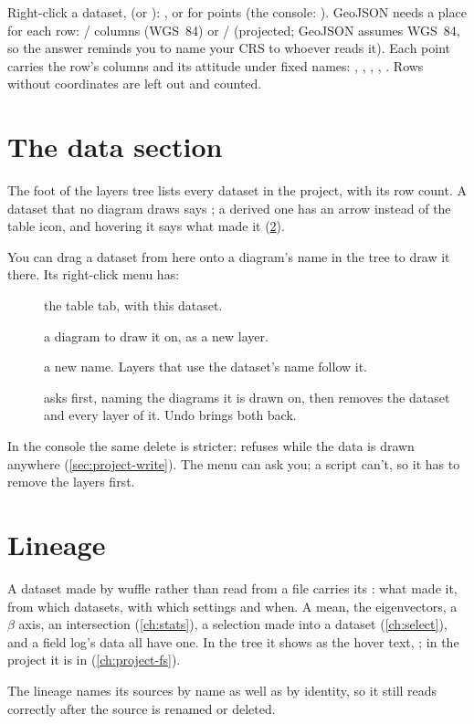 Right-click a dataset,  (or ): , or  for points (the console: ). GeoJSON needs a place for each row:  /  columns (WGS~84) or  / 
(projected; GeoJSON assumes WGS~84, so the answer reminds you to name your CRS to whoever reads it). Each
point carries the row's columns and its attitude under fixed names: , ,
, , . Rows without coordinates are left out and counted.

\section{The data section}\label{sec:data-section}

The foot of the layers tree lists every dataset in the project, with its row count. A dataset that no
diagram draws says ; a derived one has an arrow instead of the table icon, and hovering
it says what made it (\cref{sec:lineage}).

You can drag a dataset from here onto a diagram's name in the tree to draw it there. Its right-click menu
has:

\begin{description}
\item[] the table tab, with this dataset.
\item[] a diagram to draw it on, as a new layer.
\item[] a new name. Layers that use the dataset's name follow it.
\item[] asks first, naming the diagrams it is drawn on, then removes the dataset
and every layer of it. Undo brings both back.
\end{description}

\begin{note}
In the console the same delete is stricter:  refuses while the data is drawn
anywhere (\cref{sec:project-write}). The menu can ask you; a script can't, so it has to remove the layers
first.
\end{note}

\section{Lineage}\label{sec:lineage}

A dataset made by wuffle rather than read from a file carries its : what made it, from
which datasets, with which settings and when. A mean, the eigenvectors, a $\beta$ axis, an intersection
(\cref{ch:stats}), a selection made into a dataset (\cref{ch:select}), and a field log's data all have
one. In the tree it shows as the hover text, ; in the project it is in
 (\cref{ch:project-fs}).

The lineage names its sources by name as well as by identity, so it still reads correctly after the
source is renamed or deleted.

